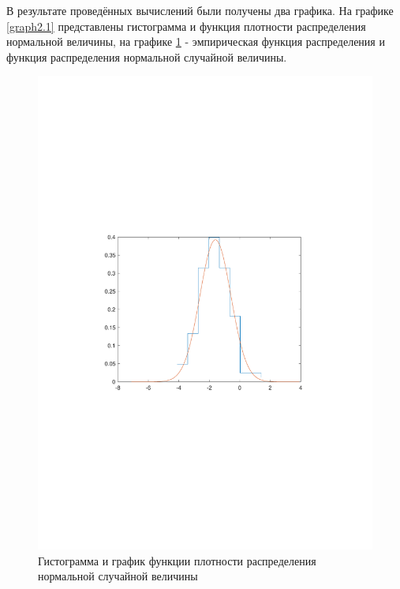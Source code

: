 \documentclass[12pt,a4paper]{scrartcl}
\begin{document}
В результате проведённых вычислений были получены два графика. На графике \ref{graph2.1} представлены гистограмма и функция плотности распределения нормальной величины, на графике \ref{graph2.2} - эмпирическая функция распределения и функция распределения нормальной случайной величины.

\begin{figure}
	\centering
	\includegraphics[width=1\linewidth]{2}
	\caption{Гистограмма  и график функции плотности распределения нормальной случайной величины}
	\label{graph2.2}
\end{figure}
\end{document}
